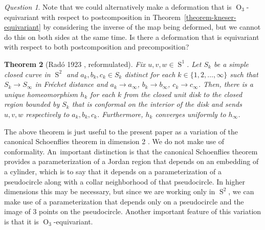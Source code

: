 \documentclass[JEP,XML,SOM,Unicode,NoFloatCountersInSection,published]{cedram}
\newtheorem{theorem}{Theorem}[subsection]
\theoremstyle{remark}
\newtheorem{question}[theorem]{Question}
\DeclareMathOperator{\orth}{O}
\DeclareMathOperator{\sphere}{S}
\begin{document}
\begin{question}
Note that we could alternatively make a deformation that is $\orth_3$\nobreakdash-equivariant with respect to postcomposition in Theorem~\ref{theorem-kneser-equivariant} by considering the inverse of the map being deformed, but we cannot do this on both sides at the same time. Is there a deformation that is equivariant with respect to both postcomposition and precomposition?
\end{question}

\begin{theorem}[Radó 1923 \cite{rado1923representation}, reformulated]\label{theorem-conformal}
Fix $u,v,w \in \sphere^1$.
Let $S_k$ be a simple closed curve in $\sphere^2$ and $a_k,b_k,c_k \in S_k$ distinct for each $k \in \{1,2,\dots,\infty\}$ such that $S_k \to S_\infty$ in Fréchet distance and $a_k \to a_\infty$, $b_k \to b_\infty$, $c_k \to c_\infty$.
Then, there is a unique homeomorphism $h_k$ for each $k$ from the closed unit disk to the closed region bounded by $S_k$ that is conformal on the interior of the disk and sends $u,v,w$
respectively to $a_k,b_k,c_k$.
Furthermore, $h_k$ converges uniformly to $h_\infty$.
\end{theorem}

The above theorem is just useful to the present paper as a variation of the canonical Schoenflies theorem in dimension 2 \cite{gauld1971canonical}. We do not make use of conformality. An~important distinction is that the canonical Schoenflies theorem provides a parameterization of a Jordan region that depends on an embedding of a cylinder, which is to say that it depends on a parameterization of a pseudocircle along with a collar neighborhood of that pseudocircle. In higher dimensions this may be necessary, but since we are working only in $\sphere^2$, we can make use of a parameterization that depends only on a pseudocircle and the image of $3$ points on the pseudocircle.
Another important feature of this variation is that it is $\orth_3$-equivariant.
\end{document}
